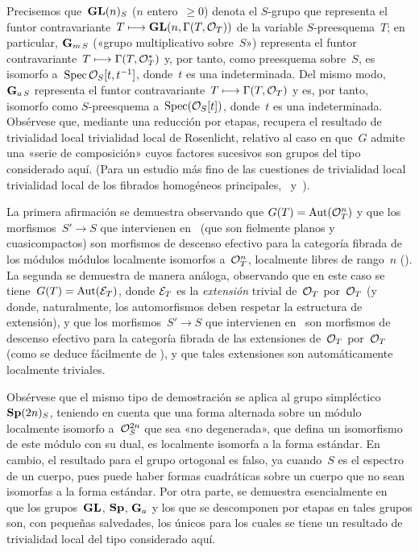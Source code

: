 Precisemos que~$\Gl(n)_S$ ($n$ entero~$\geq 0$) denota el $S$-grupo que
representa el funtor contravariante~$T\mto
\Gl(n,\Gamma(T,\cal{O}_T))$ de la variable $S$-preesquema~$T$; en particular,
$\GG_{m\,S}$ («grupo multiplicativo sobre~$S$») representa el funtor
contravariante~$T\mto \Gamma(T,\cal{O}_T^*)$ y, por tanto, como preesquema
sobre~$S$, es isomorfo a~$\Spec {\cal{O}_S[t,t^{-1}]}$, donde~$t$ es una
indeterminada. Del mismo modo, $\GG_{a\,S}$ representa el funtor
contravariante~$T\mto \Gamma(T,\cal{O}_T)$ y es, por tanto, isomorfo como
$S$-preesquema a~$\Spec(\cal{O}_S[t])$, donde~$t$ es una indeterminada.
Obsérvese que, mediante una reducción por etapas,  recupera el
resultado de
{trivialidad local}
{trivialidad local}
de Rosenlicht, relativo al caso en que~$G$ admite una «serie de composición»
cuyos factores sucesivos son grupos del tipo considerado aquí. (Para un
estudio más fino de las cuestiones de
{trivialidad local}
{trivialidad local}
de los fibrados homogéneos principales, \cf
\cite{XI.7}~y~\cite{XI.3}).

La primera afirmación se demuestra observando que
$G(T)=\Aut(\cal{O}_T^n)$ y que los morfismos~$S'\to S$ que intervienen
en~ (\ie que son fielmente planos y cuasicompactos) son morfismos
de descenso efectivo para la categoría fibrada de los
{módulos}
{módulos}
localmente
isomorfos a~$\cal{O}_T^n$, \ie localmente libres de rango~$n$
(). La segunda se demuestra de manera análoga,
observando que en este caso se tiene~$G(T)=\Aut(\cal{E}_T)$, donde
$\cal{E}_T$ es la \emph{extensión} trivial de~$\cal{O}_T$ por~$\cal{O}_T$ (y
donde, naturalmente, los automorfismos deben respetar la estructura de
extensión), y que los morfismos~$S'\to S$ que intervienen en~
son morfismos de descenso efectivo para la categoría fibrada de las
extensiones de~$\cal{O}_T$ por~$\cal{O}_T$ (como se deduce fácilmente de
), y que tales extensiones son automáticamente localmente
triviales.

\begin{remarque}
\label{XI.5.2}
Obsérvese que el mismo tipo de demostración se aplica al grupo
simpléctico~$\Symp(2n)_S$, teniendo en cuenta que una forma alternada sobre un
módulo localmente isomorfo a~$\cal{O}_S^{2n}$ que sea «no degenerada», \ie que
defina un isomorfismo de este módulo con su dual, es localmente isomorfa a la
forma estándar. En cambio, el resultado para el grupo ortogonal es falso, ya
cuando~$S$ es el espectro de un cuerpo, pues puede haber formas
cuadráticas sobre un cuerpo que no sean isomorfas a la forma estándar. Por
otra parte, se demuestra esencialmente en~\cite{XI.3} que los grupos~$\Gl$,
$\Symp$, $\GG_a$ y los que se descomponen por etapas en tales grupos son, con
pequeñas salvedades, los únicos para los cuales se tiene un resultado de
trivialidad local del tipo considerado aquí.
\end{remarque}

